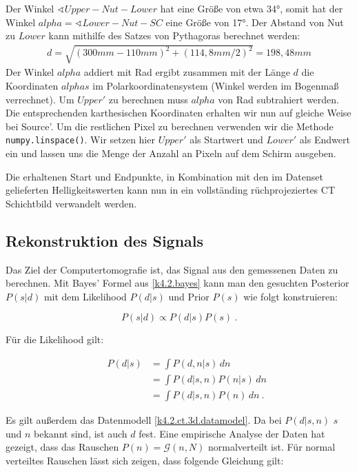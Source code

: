 Der Winkel $\sphericalangle Upper-Nut-Lower$ hat eine Größe von etwa 34°, somit hat der Winkel $alpha = \sphericalangle Lower-Nut-SC$ eine Größe von 17°. Der Abstand von Nut zu $Lower$ kann mithilfe des Satzes von Pythagoras berechnet werden:
\begin{align}
d = \sqrt{(300mm - 110mm)^2+(114,8mm/2)^2} = 198,48mm
\end{align}
Der Winkel $alpha$ addiert mit Rad ergibt zusammen mit der Länge $d$ die Koordinaten $alphas$ im Polarkoordinatensystem (Winkel werden im Bogenmaß verrechnet). Um $Upper'$ zu berechnen muss $alpha$ von Rad subtrahiert werden. Die entsprechenden karthesischen Koordinaten erhalten wir nun auf gleiche Weise bei Source'. Um die restlichen Pixel zu berechnen verwenden wir die Methode \verb+numpy.linspace()+. Wir setzen hier $Upper'$ als Startwert und $Lower'$ als Endwert ein und lassen uns die Menge der Anzahl an Pixeln auf dem Schirm ausgeben. 

Die erhaltenen Start und Endpunkte, in Kombination mit den im Datenset gelieferten Helligkeitswerten kann nun in ein vollständing rüchprojeziertes CT Schichtbild verwandelt werden.


\subsection{Rekonstruktion des Signals}

Das Ziel der Computertomografie ist, das Signal aus den gemessenen Daten zu berechnen. Mit Bayes' Formel aus \cref{k4.2.bayes} kann man den gesuchten Posterior $P(s|d)$ mit dem Likelihood $P(d|s)$ und Prior $P(s)$ wie folgt konstruieren:

\begin{equation}
  P(s|d) \propto P(d|s)P(s)\ .
\end{equation}

Für die Likelihood gilt:

\begin{equation}
  \begin{aligned}
    && P(d|s) &= \int P(d,n|s) \,dn  \\
    &&  &= \int P(d|s,n) P(n|s) \,dn \\
    && &= \int P(d|s,n) P(n) \,dn \ .
  \end{aligned}
\end{equation}

Es gilt außerdem das Datenmodell \cref{k4.2.ct.3d.datamodel}. Da bei $P(d|s,n)$ $s$ und $n$ bekannt sind, ist auch $d$ fest. Eine empirische Analyse der Daten hat gezeigt, dass das Rauschen $P(n) = \mathcal{G}(n,N)$ normalverteilt ist. Für normal verteiltes Rauschen lässt sich zeigen, dass folgende Gleichung gilt:

